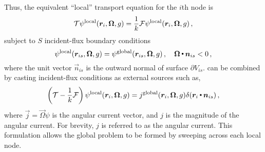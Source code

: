 Thus, the equivalent ``local'' transport equation for the $i$th node is
\begin{equation}
    \oper{T}\psi^{\mathrm{local}}(\vec{r}_i,\vec{\Omega},g) = 
    \frac{1}{k} \oper{F} \psi^{\mathrm{local}}(\vec{r}_i,\vec{\Omega},g) \, ,
    \label{eq:local}
\end{equation}
subject to  $S$  incident-flux boundary conditions 
\begin{equation}
    \psi^{\mathrm{local}}(\vec{r}_{is}, \vec{\Omega}, g) = 
    \psi^{\mathrm{global}}(\vec{r}_{is},\vec{\Omega}, g) \, ,
    \quad \vec{\Omega} \dotp \vec{n}_{is} < 0 \, ,
    \label{eq:localbc}
\end{equation}  
where the unit vector $\vec{n}_{is}$ is the outward normal of surface 
$\partial V_{is}$.  can be combined by 
casting 
incident-flux conditions as external sources such as, 
\begin{equation}
    \left ( \oper{T} - \frac{1}{k} \oper{F} \right 
    )\psi^{\mathrm{local}}(\vec{r}_i,\vec{\Omega},g) = 
    j^{\mathrm{global}}(\vec{r}_i, \vec{\Omega},g) 
    \delta(\vec{r}_i \dotp \vec{n}_{is}) \, ,  
    \label{eq:localcombined}
\end{equation}
where $\vec{j} = \vec{\Omega} \psi$ is the angular current vector, and $j$ is 
the magnitude of the angular current.  For brevity, $j$ is referred to as the 
angular current. This 
formulation allows the global problem to be formed by sweeping across each 
local node.

